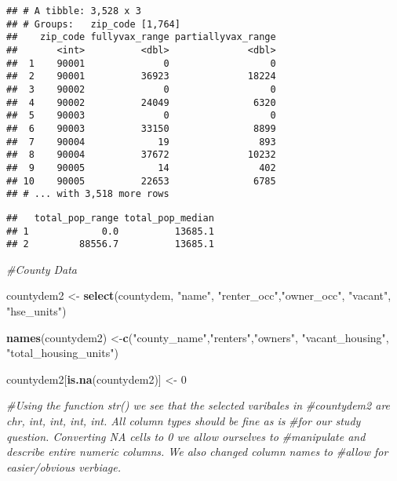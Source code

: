 \documentclass[
]{article}
\newenvironment{Shaded}{\begin{snugshade}}{\end{snugshade}}
\newcommand{\CommentTok}[1]{\textcolor[rgb]{0.56,0.35,0.01}{\textit{#1}}}
\newcommand{\DataTypeTok}[1]{\textcolor[rgb]{0.13,0.29,0.53}{#1}}
\newcommand{\DecValTok}[1]{\textcolor[rgb]{0.00,0.00,0.81}{#1}}
\newcommand{\KeywordTok}[1]{\textcolor[rgb]{0.13,0.29,0.53}{\textbf{#1}}}
\newcommand{\NormalTok}[1]{#1}
\newcommand{\OperatorTok}[1]{\textcolor[rgb]{0.81,0.36,0.00}{\textbf{#1}}}
\newcommand{\StringTok}[1]{\textcolor[rgb]{0.31,0.60,0.02}{#1}}
\begin{document}
\begin{verbatim}
## # A tibble: 3,528 x 3
## # Groups:   zip_code [1,764]
##    zip_code fullyvax_range partiallyvax_range
##       <int>          <dbl>              <dbl>
##  1    90001              0                  0
##  2    90001          36923              18224
##  3    90002              0                  0
##  4    90002          24049               6320
##  5    90003              0                  0
##  6    90003          33150               8899
##  7    90004             19                893
##  8    90004          37672              10232
##  9    90005             14                402
## 10    90005          22653               6785
## # ... with 3,518 more rows
\end{verbatim}

\begin{Shaded}
\end{Shaded}

\begin{verbatim}
##   total_pop_range total_pop_median
## 1             0.0          13685.1
## 2         88556.7          13685.1
\end{verbatim}

\begin{Shaded}
\begin{Highlighting}[]
\CommentTok{#County Data }

\NormalTok{countydem2 <-}\StringTok{ }\KeywordTok{select}\NormalTok{(countydem, }\StringTok{"name"}\NormalTok{, }\StringTok{"renter_occ"}\NormalTok{,}\StringTok{"owner_occ"}\NormalTok{, }
                     \StringTok{"vacant"}\NormalTok{, }\StringTok{"hse_units"}\NormalTok{)}

\KeywordTok{names}\NormalTok{(countydem2) <-}\KeywordTok{c}\NormalTok{(}\StringTok{"county_name"}\NormalTok{,}\StringTok{"renters"}\NormalTok{,}\StringTok{"owners"}\NormalTok{,}
                      \StringTok{"vacant_housing"}\NormalTok{, }\StringTok{"total_housing_units"}\NormalTok{)}

\NormalTok{countydem2[}\KeywordTok{is.na}\NormalTok{(countydem2)] <-}\StringTok{ }\DecValTok{0}

\CommentTok{#Using the function str() we see that the selected varibales in }
\CommentTok{#countydem2 are chr, int, int, int, int. All column types should be fine as is }
\CommentTok{#for our study question. Converting NA cells to 0 we allow ourselves to }
\CommentTok{#manipulate and describe entire numeric columns. We also changed column names to }
\CommentTok{#allow for easier/obvious verbiage.}
\end{Highlighting}
\end{Shaded}
\end{document}
